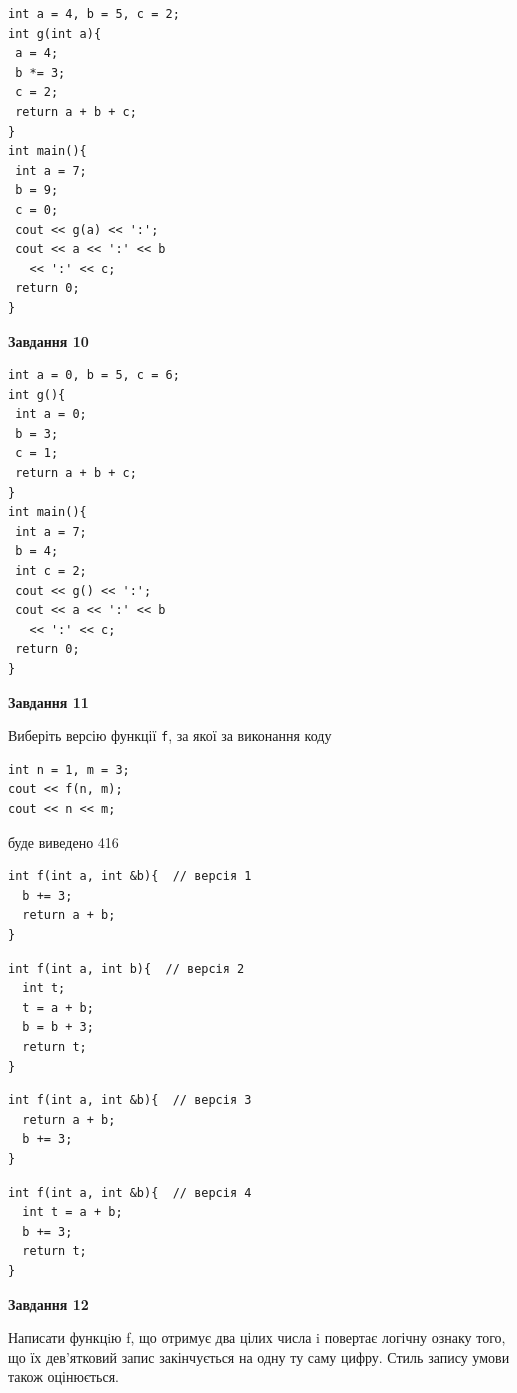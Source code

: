 \documentclass[12pt, ukrainian]{article}
\def\code#1{\Verb!#1!}
\begin{document}
{\begin {large}
\begin{minipage}[t]{7.0cm}
\begin{verbatim}
int a = 4, b = 5, c = 2;
int g(int a){
 a = 4;
 b *= 3;
 c = 2;
 return a + b + c;
}
int main(){
 int a = 7;
 b = 9;
 c = 0;
 cout << g(a) << ':';
 cout << a << ':' << b 
   << ':' << c;
 return 0;
}
\end{verbatim}



\begin{center}
\textbf{Завдання 10}
\end{center}
\vspace{-8mm}

\begin{verbatim}
int a = 0, b = 5, c = 6;
int g(){
 int a = 0;
 b = 3;
 c = 1;
 return a + b + c;
}
int main(){
 int a = 7;
 b = 4;
 int c = 2;
 cout << g() << ':';
 cout << a << ':' << b 
   << ':' << c;
 return 0;
}
\end{verbatim}

\end{minipage}
\vline \hspace{1mm}
\begin{minipage}[t]{11.0cm}

\begin{center}
\textbf{Завдання 11}
\end{center}
Виберіть версію функції \code{f}, за якої за виконання коду
\begin{verbatim}
int n = 1, m = 3;
cout << f(n, m);
cout << n << m;
\end{verbatim}

буде виведено 416

\begin{verbatim}
int f(int a, int &b){  // версія 1
  b += 3;
  return a + b;
}
\end{verbatim}

\vspace{-8mm}\begin{verbatim}
int f(int a, int b){  // версія 2
  int t;
  t = a + b;
  b = b + 3;
  return t;
}
\end{verbatim}

\vspace{-8mm}\begin{verbatim}
int f(int a, int &b){  // версія 3
  return a + b;
  b += 3;
}
\end{verbatim}

\vspace{-8mm}\begin{verbatim}
int f(int a, int &b){  // версія 4
  int t = a + b;
  b += 3;
  return t;
}
\end{verbatim}



\begin{center}
\textbf{Завдання 12}
\end{center}

Написати функцiю f, що отримує два цілих числа i повертає логічну ознаку того, що їх дев'ятковий запис закінчується на одну ту саму цифру. Стиль запису умови також оцінюється.\par

\end{minipage}

\end {large}}
\end{document}
